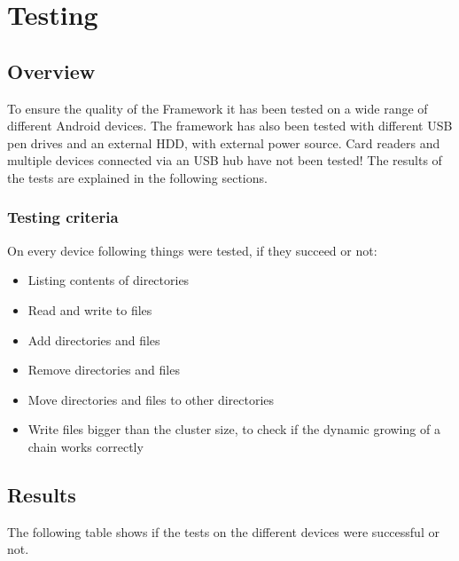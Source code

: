 \chapter{Testing}

\section{Overview}

To ensure the quality of the Framework it has been tested on a wide range of different Android devices. The framework has also been tested with different USB pen drives and an external HDD, with external power source. Card readers and multiple devices connected via an USB hub have not been tested! The results of the tests are explained in the following sections.

\subsection{Testing criteria}

On every device following things were tested, if they succeed or not:

\begin{itemize}
\item Listing contents of directories
\item Read and write to files
\item Add directories and files
\item Remove directories and files
\item Move directories and files to other directories
\item Write files bigger than the cluster size, to check if the dynamic growing of a chain works correctly
\end{itemize}

\section{Results}

The following table shows if the tests on the different devices were successful or not.

